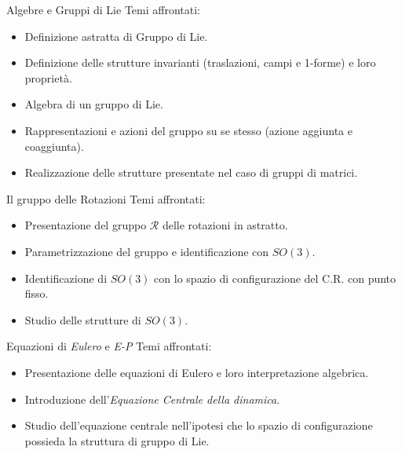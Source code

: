 \documentclass{beamer}
\begin{document}
\begin{frame}{Algebre e Gruppi di Lie}
Temi affrontati:
\begin{itemize}
\item Definizione astratta di Gruppo di Lie.
\item Definizione delle strutture invarianti (traslazioni, campi e 1-forme) e loro proprietà.
\item Algebra di un gruppo di Lie.
\item Rappresentazioni e azioni del gruppo su se stesso (azione aggiunta e coaggiunta).
\item Realizzazione delle strutture presentate nel caso di gruppi di matrici.
\end{itemize}
\end{frame}

\begin{frame}{Il gruppo delle Rotazioni}
Temi affrontati:
\begin{itemize}
\item Presentazione del gruppo $\mathscr{R}$ delle rotazioni in astratto.
\item Parametrizzazione del gruppo e identificazione con $SO(3)$.
\item Identificazione di $SO(3)$ con lo spazio di configurazione del C.R. con punto fisso.
\item Studio delle strutture di $SO(3)$.
\end{itemize}
\end{frame}


\begin{frame}{Equazioni di \emph{Eulero} e \emph{E-P}}
Temi affrontati:
\begin{itemize}
\item Presentazione delle equazioni di Eulero e loro interpretazione algebrica.
\item Introduzione dell'\emph{Equazione Centrale della dinamica}.
\item Studio dell'equazione centrale nell'ipotesi che lo spazio di configurazione possieda la struttura di gruppo di Lie.
\end{itemize} \end{frame}
\end{document}
